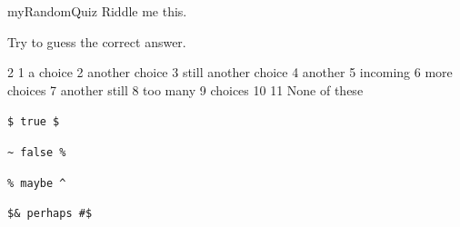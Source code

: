 \documentclass{article}
\begin{document}
\begin{quiz*}{myRandomQuiz}
    Riddle me this.
\begin{questions}
    \item Try to guess the correct answer.
    \begin{answers}{2}
    \bChoices[random=true]
         1 a choice\eAns
        \label{eq} 2 another choice\eAns
         3 still another choice\eAns
         4 another\eAns
         5 incoming\eAns
         6 more choices\eAns
         7 another still\eAns
         8 too many\eAns
         9 choices\eAns
         10 \eAns
        \eFreeze
         11 None of these\eAns
    \eChoices
    \end{answers}
\end{questions}
\end{quiz*}\quad\ScoreField\currQuiz\CorrButton\currQuiz


\newpage

\begin{rtVW}
\verb!$ true $!
\end{rtVW}
\begin{rtVW}
\verb!~ false %!
\end{rtVW}
\begin{rtVW}
\verb!% maybe ^!
\end{rtVW}
\begin{rtVW}
\verb!$& perhaps #$!
\end{rtVW}
\eRTVToks
\end{document}
